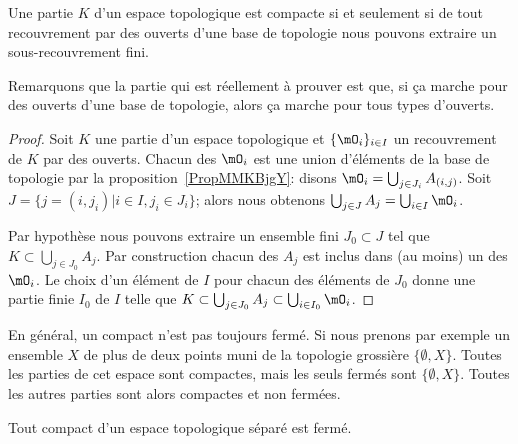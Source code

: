 \begin{lemma}   \label{LemOWVooZKndbI}
    Une partie \( K\) d'un espace topologique est compacte si et seulement si de tout recouvrement par des ouverts d'une base de topologie nous pouvons extraire un sous-recouvrement fini.
\end{lemma}
Remarquons que la partie qui est réellement à prouver est que, si \og ça marche \fg{} pour des ouverts d'une base de topologie, alors \og ça marche\fg{} pour tous types d'ouverts.
\begin{proof}
    Soit \( K\) une partie d'un espace topologique et \( \{ \mO_i \}_{i\in I}\) un recouvrement de \( K\) par des ouverts. Chacun des \( \mO_i\) est une union d'éléments de la base de topologie par la proposition~\ref{PropMMKBjgY}: disons \( \mO_i = \bigcup_{j \in J_i} A_{(i,j)} \). Soit \( J = \{ j = (i, j_i) | i \in I, j_i \in J_i \} \); alors nous obtenons  \( \bigcup_{j\in J}A_j=\bigcup_{i\in I}\mO_i\).

    Par hypothèse nous pouvons extraire un ensemble fini \( J_0\subset J\) tel que \( K\subset\bigcup_{j\in J_0}A_j\). Par construction chacun des \( A_j\) est inclus dans (au moins) un des \( \mO_i\). Le choix d'un élément de \( I\) pour chacun des éléments de \( J_0\) donne une partie finie \( I_0\) de \( I\) telle que \( K\subset\bigcup_{j\in J_0}A_j\subset\bigcup_{i\in I_0}\mO_i\).
\end{proof}


\begin{example}
    En général, un compact n'est pas toujours fermé. Si nous prenons par exemple un ensemble \( X\) de plus de deux points muni de la topologie grossière \( \{ \emptyset,X \}\). Toutes les parties de cet espace sont compactes, mais les seuls fermés sont \( \{ \emptyset,X \}\). Toutes les autres parties sont alors compactes et non fermées.
\end{example}

\begin{proposition}\label{PropUCUknHx}
    Tout compact d'un espace topologique séparé est fermé.
\end{proposition}

